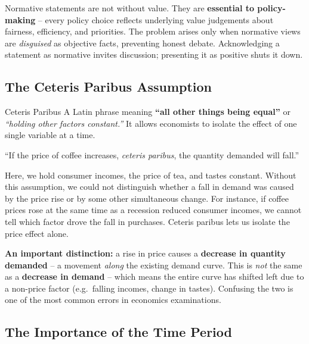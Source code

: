 \documentclass[11pt, a4paper, twoside]{book}
\begin{document}
\begin{coreidea}
Normative statements are not without value. They are \textbf{essential to policy-making} -- every policy choice reflects underlying value judgements about fairness, efficiency, and priorities. The problem arises only when normative views are \emph{disguised} as objective facts, preventing honest debate. Acknowledging a statement as normative invites discussion; presenting it as positive shuts it down.
\end{coreidea}

\subsection{The Ceteris Paribus Assumption}

\begin{keyterm}{Ceteris Paribus}
A Latin phrase meaning \textbf{``all other things being equal''} or \emph{``holding other factors constant.''} It allows economists to isolate the effect of one single variable at a time.
\end{keyterm}

\begin{example}
``If the price of coffee increases, \emph{ceteris paribus}, the quantity demanded will fall.''

Here, we hold consumer incomes, the price of tea, and tastes constant. Without this assumption, we could not distinguish whether a fall in demand was caused by the price rise or by some other simultaneous change. For instance, if coffee prices rose at the same time as a recession reduced consumer incomes, we cannot tell which factor drove the fall in purchases. Ceteris paribus lets us isolate the price effect alone.

\textbf{An important distinction:} a rise in price causes a \textbf{decrease in quantity demanded} -- a movement \emph{along} the existing demand curve. This is \emph{not} the same as a \textbf{decrease in demand} -- which means the entire curve has shifted left due to a non-price factor (e.g.\ falling incomes, change in tastes). Confusing the two is one of the most common errors in economics examinations.
\end{example}

\subsection{The Importance of the Time Period}
\end{document}
